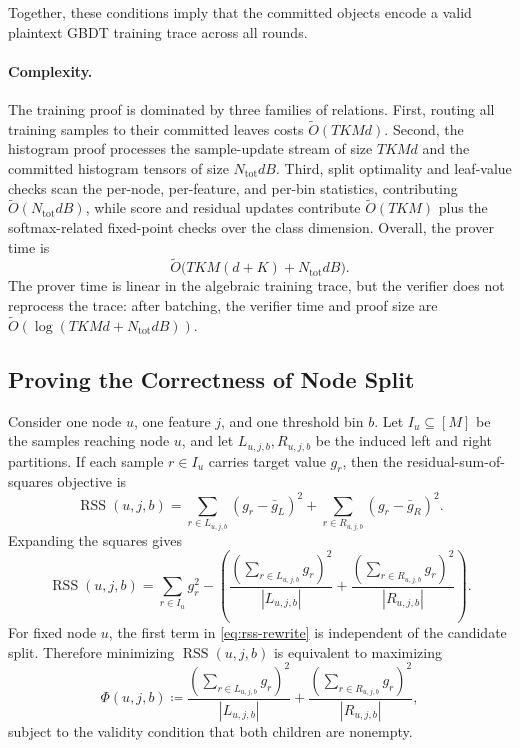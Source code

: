 Together, these conditions imply that the committed objects encode a valid
plaintext GBDT training trace across all rounds.

\paragraph{Complexity.}
The training proof is dominated by three families of relations. First, routing
all training samples to their committed leaves costs
$\tilde{O}(TKMd)$. Second, the histogram proof processes the sample-update
stream of size $TKMd$ and the committed histogram tensors of size
$N_{\mathrm{tot}}dB$. Third, split optimality and leaf-value checks scan the
per-node, per-feature, and per-bin statistics, contributing
$\tilde{O}(N_{\mathrm{tot}}dB)$, while score and residual updates contribute
$\tilde{O}(TKM)$ plus the softmax-related fixed-point checks over the class
dimension. Overall, the prover time is
\[
    \tilde{O}\bigl(TKM(d+K) + N_{\mathrm{tot}}dB\bigr).
\]
The prover time is linear in the algebraic training trace, but the verifier
does not reprocess the trace: after batching, the verifier time and proof size
are
$\tilde{O}(\log(TKMd+N_{\mathrm{tot}}dB))$.

\subsection{Proving the Correctness of Node Split}\label{subsec:method-node-split}

Consider one node $u$, one feature $j$, and one threshold bin $b$. Let
$I_u \subseteq [M]$ be the samples reaching node $u$, and let
$L_{u,j,b},R_{u,j,b}$ be the induced left and right partitions. If each sample
$r\in I_u$ carries target value $g_r$, then the residual-sum-of-squares
objective is
\[
\operatorname{RSS}(u,j,b)
=
\sum_{r\in L_{u,j,b}}(g_r-\bar{g}_L)^2
+
\sum_{r\in R_{u,j,b}}(g_r-\bar{g}_R)^2.
\]
Expanding the squares gives
\begin{equation}\label{eq:rss-rewrite}
\operatorname{RSS}(u,j,b)
=
\sum_{r\in I_u} g_r^2
-
\left(
\frac{\left(\sum_{r\in L_{u,j,b}} g_r\right)^2}{|L_{u,j,b}|}
+
\frac{\left(\sum_{r\in R_{u,j,b}} g_r\right)^2}{|R_{u,j,b}|}
\right).
\end{equation}
For fixed node $u$, the first term in \eqref{eq:rss-rewrite} is independent of
the candidate split. Therefore minimizing $\operatorname{RSS}(u,j,b)$ is
equivalent to maximizing
\begin{equation}\label{eq:split-objective}
\Phi(u,j,b)
\coloneqq
\frac{\left(\sum_{r\in L_{u,j,b}} g_r\right)^2}{|L_{u,j,b}|}
+
\frac{\left(\sum_{r\in R_{u,j,b}} g_r\right)^2}{|R_{u,j,b}|},
\end{equation}
subject to the validity condition that both children are nonempty.

